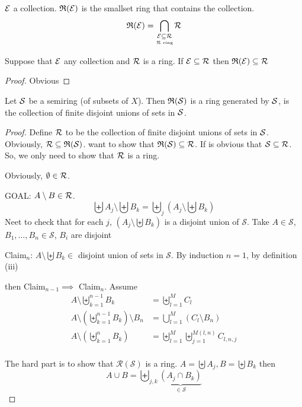 \begin{definition}
  $\mathcal E$ a collection. $\mathfrak R(\mathcal E)$ is the smallset ring that contains the collection. 
  \[\mathfrak R(\mathcal E) = \bigcap_{\underset{\mathcal R \text{ ring}}{\mathcal E \subseteq \mathcal R}} \mathcal R\]
\end{definition}

\begin{lemma}
  Suppose that $\mathcal E$ any collection and $\mathcal R$ is a ring. If $\mathcal E \subseteq \mathcal R$ then $\mathfrak R(\mathcal E) \subseteq \mathcal R$
\end{lemma}

\begin{proof}
  Obvious
\end{proof}

\begin{theorem}
  Let $\mathcal S$ be a semiring (of subsets of $X$). Then $\mathfrak R(\mathcal S)$ is a ring generated by $\mathcal S$,
  is the collection of finite disjoint unions of sets in $\mathcal S$.
\end{theorem}

\begin{proof}
  Define $\mathcal R$ to be the collection of finite disjoint unions of sets in $\mathcal S$.
  Obviously, $\mathcal R \subseteq \mathfrak R(\mathcal S)$. want to show that $\mathfrak R(\mathcal S) \subseteq \mathcal R$.
  If is obvious that $\mathcal S \subseteq \mathcal R$. So, we only need to show that $\mathcal R$ is a ring.

  Obviously, $\emptyset \in \mathcal R$.
  
  GOAL: $A \setminus B \in \mathcal R$.
  \[\biguplus A_j \setminus \biguplus B_k = \biguplus_j (A_j \setminus \biguplus B_k)\]
  Neet to check that for each $j$, $(A_j \setminus \biguplus B_k)$ is a disjoint union of $\mathcal{S}$. 
  Take $A \in \mathcal{S}$, $B_1, \dotsc, B_n \in \mathcal{S}$, $B_i$ are disjoint

  Claim$_n$: $A \setminus \biguplus B_k \in$ disjoint union of sets in $\mathcal{S}$.
  By induction $n = 1$, by definition (iii)

  then Claim$_{n-1} \implies$ Claim$_n$. Assume 
  \begin{align*}
    A \setminus \biguplus_{k=1}^{n-1}B_k &= \biguplus_{l=1}^M C_l \\
    A \setminus \left(\biguplus_{k=1}^{n-1}B_k\right) \setminus B_n &= \bigcup_{l=1}^M (C_l\setminus B_n) \\
    A \setminus \left(\biguplus_{k=1}^{n}B_k\right) &= \biguplus_{l=1}^M\biguplus_{j=1}^{M(l, n)}C_{l,n,j} \\ 
  \end{align*}

  The hard part is to show that $\mathcal{R}(\mathcal{S})$ is a ring.
  $A = \biguplus A_j, B = \biguplus B_k$ then
  \[A \cup B = \biguplus_{j,k} \underbrace{(A_j \cap B_k)}_{\in \mathcal{S}}\]
\end{proof}

